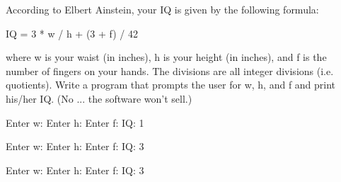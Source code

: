 According to Elbert Ainstein, your IQ is given by the following formula:
\begin{console}[frame=none]

	IQ = 3 * w / h + (3 + f) / 42

\end{console}
where w is your waist (in inches), 
h is your height (in inches), 
and f is the number of fingers on your hands. 
The divisions are all integer divisions (i.e. quotients). 
Write a program that prompts the user for w, h, and f and print his/her IQ. 
(No ... the software won't sell.) 

\resett
\nextt
\begin{console}[commandchars=\\\{\}]
Enter w: 
Enter h: 
Enter f: 
IQ: 1
\end{console}

\nextt
\begin{console}[commandchars=\\\{\}]
Enter w: 
Enter h: 
Enter f: 
IQ: 3
\end{console}

\nextt
\begin{console}[commandchars=\\\{\}]
Enter w: 
Enter h: 
Enter f: 
IQ: 3
\end{console}

